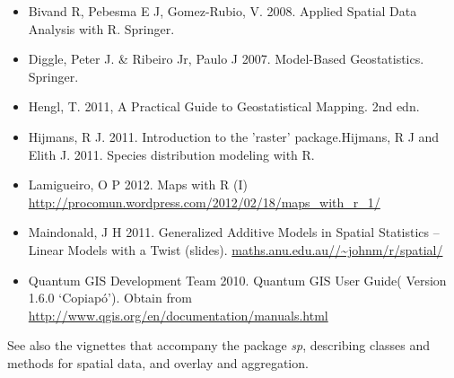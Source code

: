 \begin{itemize}
\item[] Bivand R, Pebesma E J, Gomez-Rubio, V. 2008. Applied Spatial Data
Analysis with R.  Springer.
\item[] Diggle, Peter J. \& Ribeiro Jr, Paulo J 2007. Model-Based Geostatistics.
Springer.
\item[] Hengl, T. 2011, A Practical Guide to Geostatistical
  Mapping. 2nd edn.
\item[] Hijmans, R J. 2011. Introduction to the 'raster' package.\newline
[With the R package {\em raster} attached, type \txtt{vignette("Raster")}.
\item[] Hijmans, R J and Elith J. 2011. Species distribution modeling with R.
\item[] Lamigueiro, O P 2012. Maps with R (I)
\url{http://procomun.wordpress.com/2012/02/18/maps_with_r_1/}
\item[] Maindonald, J H 2011.  Generalized Additive Models in Spatial
  Statistics -- Linear Models with a Twist (slides).
\url{maths.anu.edu.au//~johnm/r/spatial/}
\item[] Quantum GIS Development Team 2010.  Quantum GIS User Guide(
  Version 1.6.0 `Copiap\'{o}').  Obtain from
\url{http://www.qgis.org/en/documentation/manuals.html}
\end{itemize}
See also the vignettes that accompany the package {\em sp}, describing
classes and methods for spatial data, and overlay and aggregation.
